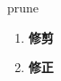 
\begin{frame}
{\huge prune}
\begin{center}
\begin{enumerate}\Large
  \item \textbf{修剪}
  \item \textbf{修正}
\end{enumerate}
\end{center}
\end{frame}
